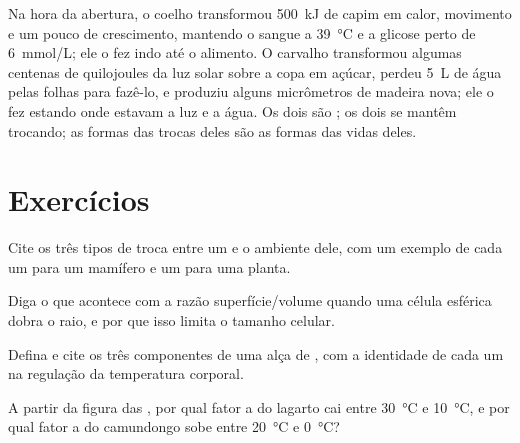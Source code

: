 \begin{example}\label{ex:b1:organism-environment:budgets}
Na hora da abertura, o coelho transformou \qty{500}{kJ} de capim em
calor, movimento e um pouco de crescimento, mantendo o sangue a
\qty{39}{\celsius} e a glicose perto de \qty{6}{mmol/L}; ele o fez indo
até o alimento. O carvalho transformou algumas centenas de quilojoules
da luz solar sobre a copa em açúcar, perdeu \qty{5}{L} de água pelas
folhas para fazê-lo, e produziu alguns micrômetros de madeira nova; ele
o fez estando onde estavam a luz e a água. Os dois são ;
os dois se mantêm trocando; as formas das trocas deles são as formas das
vidas deles.
\end{example}

\section{Exercícios}

\begin{exercise}[$\star$]\label{exo:b1:organism-environment:1}
Cite os três tipos de troca entre um  e o ambiente dele, com um
exemplo de cada um para um mamífero e um para uma planta.
\end{exercise}

\begin{exercise}[$\star$]\label{exo:b1:organism-environment:2}
Diga o que acontece com a razão superfície/volume quando uma célula
esférica dobra o raio, e por que isso limita o tamanho celular.
\end{exercise}

\begin{exercise}[$\star$]\label{exo:b1:organism-environment:3}
Defina  e cite os três componentes de uma alça de
, com a identidade de cada um na regulação da
temperatura corporal.
\end{exercise}

\begin{exercise}[$\star$]\label{exo:b1:organism-environment:4}
A partir da figura das , por qual fator a  do lagarto cai entre \qty{30}{\celsius} e
\qty{10}{\celsius}, e por qual fator a do camundongo sobe entre
\qty{20}{\celsius} e \qty{0}{\celsius}?
\end{exercise}

